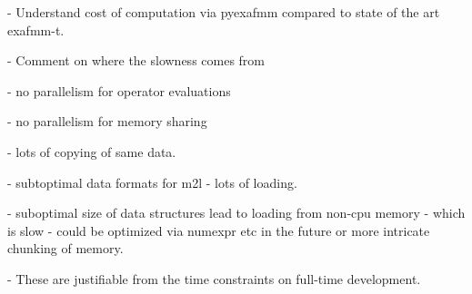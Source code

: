 - Understand cost of computation via pyexafmm compared to state of the art exafmm-t.

- Comment on where the slowness comes from

- no parallelism for operator evaluations

- no parallelism for memory sharing

- lots of copying of same data.

- subtoptimal data formats for m2l - lots of loading.

- suboptimal size of data structures lead to loading from non-cpu memory - which is slow - could be optimized via numexpr etc in the future or more intricate chunking of memory.

- These are justifiable from the time constraints on full-time development.

